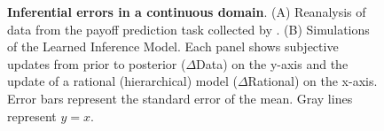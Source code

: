 

\begin{figure}
\centering
    \hfill
  \caption{\textbf{Inferential errors in a continuous domain}. (A) Reanalysis of data from the payoff prediction task collected by \cite{gershman2017blessing}. (B) Simulations of the Learned Inference Model. Each panel shows subjective updates from prior to posterior ($\Delta$Data) on the y-axis and the update of a rational (hierarchical) model ($\Delta$Rational) on the x-axis. Error bars represent the standard error of the mean. Gray lines represent $y=x$.} 
  \label{fig:slotmachine}
\end{figure}

